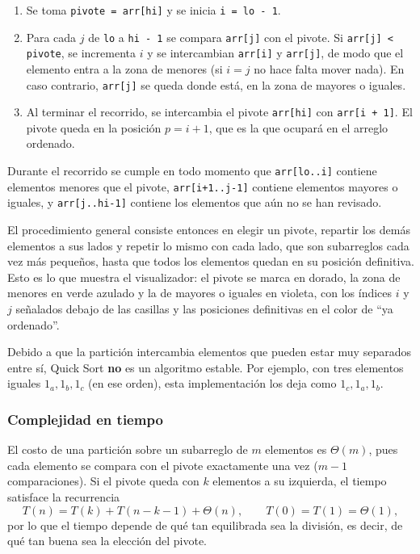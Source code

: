 \documentclass[11pt,letterpaper]{article}
\begin{document}
\begin{enumerate}
  \item Se toma \texttt{pivote = arr[hi]} y se inicia \texttt{i = lo - 1}.
  \item Para cada $j$ de \texttt{lo} a \texttt{hi - 1} se compara \texttt{arr[j]} con el pivote. Si \texttt{arr[j] < pivote}, se incrementa $i$ y se intercambian \texttt{arr[i]} y \texttt{arr[j]}, de modo que el elemento entra a la zona de menores (si $i = j$ no hace falta mover nada). En caso contrario, \texttt{arr[j]} se queda donde está, en la zona de mayores o iguales.
  \item Al terminar el recorrido, se intercambia el pivote \texttt{arr[hi]} con \texttt{arr[i + 1]}. El pivote queda en la posición $p = i + 1$, que es la que ocupará en el arreglo ordenado.
\end{enumerate}

Durante el recorrido se cumple en todo momento que \texttt{arr[lo..i]} contiene elementos menores que el pivote, \texttt{arr[i+1..j-1]} contiene elementos mayores o iguales, y \texttt{arr[j..hi-1]} contiene los elementos que aún no se han revisado.

El procedimiento general consiste entonces en elegir un pivote, repartir los demás elementos a sus lados y repetir lo mismo con cada lado, que son subarreglos cada vez más pequeños, hasta que todos los elementos quedan en su posición definitiva. Esto es lo que muestra el visualizador: el pivote se marca en dorado, la zona de menores en verde azulado y la de mayores o iguales en violeta, con los índices $i$ y $j$ señalados debajo de las casillas y las posiciones definitivas en el color de ``ya ordenado''.

Debido a que la partición intercambia elementos que pueden estar muy separados entre sí, Quick Sort \textbf{no} es un algoritmo estable. Por ejemplo, con tres elementos iguales $1_a, 1_b, 1_c$ (en ese orden), esta implementación los deja como $1_c, 1_a, 1_b$.

\subsubsection{Complejidad en tiempo}

El costo de una partición sobre un subarreglo de $m$ elementos es $\Theta(m)$, pues cada elemento se compara con el pivote exactamente una vez ($m - 1$ comparaciones). Si el pivote queda con $k$ elementos a su izquierda, el tiempo satisface la recurrencia
\[
  T(n) = T(k) + T(n - k - 1) + \Theta(n), \qquad T(0) = T(1) = \Theta(1),
\]
por lo que el tiempo depende de qué tan equilibrada sea la división, es decir, de qué tan buena sea la elección del pivote.
\end{document}
